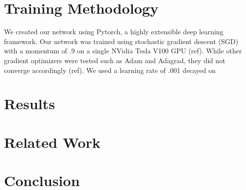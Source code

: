 \documentclass[12pt,conference]{ieeeconf}
\begin{document}
\section{Training Methodology}
We created our network using Pytorch, a highly extensible deep learning framework. Our network was trained using stochastic gradient descent (SGD) with a momentum of .9 on a single NVidia Tesla V100 GPU (ref). While other gradient optimizers were tested such as Adam and Adagrad, they did not converge accordingly (ref). We used a learning rate of .001 decayed on 

\section{Results}

\section{Related Work}

\section{Conclusion}


\end{document}
